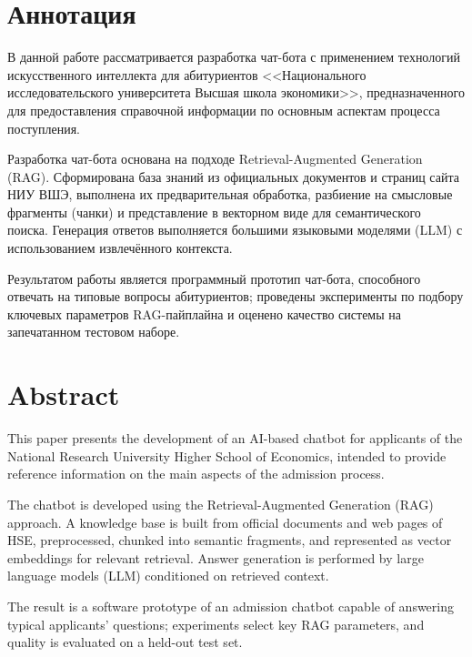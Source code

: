 \documentclass[a4paper,12pt]{extarticle}
\begin{document}

\newpage
\setcounter{page}{2}

{
\hypersetup{linkcolor=black}
\tableofcontents
}

\newpage

\section*{Аннотация}
В данной работе рассматривается разработка чат-бота с применением технологий искусственного интеллекта для абитуриентов <<Национального исследовательского университета Высшая школа экономики>>, предназначенного для предоставления справочной информации по основным аспектам процесса поступления.

Разработка чат-бота основана на подходе Retrieval-Augmented Generation (RAG). Сформирована база знаний из официальных документов и страниц сайта НИУ ВШЭ, выполнена их предварительная обработка, разбиение на смысловые фрагменты (чанки) и представление в векторном виде для семантического поиска. Генерация ответов выполняется большими языковыми моделями (LLM) с использованием извлечённого контекста.

Результатом работы является программный прототип чат-бота, способного отвечать на типовые вопросы абитуриентов; проведены эксперименты по подбору ключевых параметров RAG-пайплайна и оценено качество системы на запечатанном тестовом наборе.

\section*{Abstract}
This paper presents the development of an AI-based chatbot for applicants of the National Research University Higher School of Economics, intended to provide reference information on the main aspects of the admission process.

The chatbot is developed using the Retrieval-Augmented Generation (RAG) approach. A knowledge base is built from official documents and web pages of HSE, preprocessed, chunked into semantic fragments, and represented as vector embeddings for relevant retrieval. Answer generation is performed by large language models (LLM) conditioned on retrieved context.

The result is a software prototype of an admission chatbot capable of answering typical applicants' questions; experiments select key RAG parameters, and quality is evaluated on a held-out test set.

\end{document}

